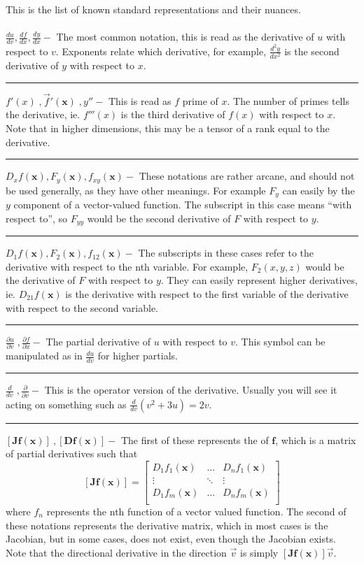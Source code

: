 \documentclass{article}
\newcommand{\pt}{\mathbf}
\begin{document}

This is the list of known standard representations and their nuances.\\
\\
$\frac{du}{dv}, \frac{df}{dx}, \frac{dy}{dx}-$ The most common notation, this is read as the derivative of $u$ with respect to $v$. Exponents relate which derivative, for example, $\frac{d^2y}{dx^2}$ is the second derivative of $y$ with respect to $x$.\\
\hrule
$f'(x)\; ,\vec{f}'(\pt{x})\;, y''-$ This is read as $f$ prime of $x$. The number of primes tells the derivative, ie. $f'''(x)$ is the third derivative of $f(x)$ with respect to $x$. Note that in higher dimensions, this may be a tensor of a rank equal to the derivative.\\
\hrule
$D_xf(\pt{x}), F_y(\pt{x}), f_{xy}(\pt{x})-$ These notations are rather arcane, and should not be used generally, as they have other meanings. For example $F_y$ can easily by the $y$ component of a vector-valued function. The subscript in this case means ``with respect to'', so $F_{yy}$ would be the second derivative of $F$ with respect to $y$.\\
\hrule
$D_1f(\pt{x}), F_2(\pt{x}), f_{12}(\pt{x})-$ The subscripts in these cases refer to the derivative with respect to the nth variable. For example, $F_2(x,y,z)$ would be the derivative of $F$ with respect to $y$. They can easily represent higher derivatives, ie. $D_{21}f(\pt{x})$ is the derivative with respect to the first variable of the derivative with respect to the second variable.\\
\hrule
$\frac{\partial u}{\partial v}\; ,\frac{\partial f}{\partial x}-$ The partial derivative of $u$ with respect to $v$. This symbol can be manipulated as in $\frac{du}{dv}$ for higher partials.\\
\hrule
$\frac{d}{dv}\;,\frac{\partial}{\partial v}-$ This is the operator version of the derivative. Usually you will see it acting on something such as $\frac{d}{dv}(v^2+3u) = 2v$.\\
\hrule
$[\mathbf{Jf}(\pt{x})]\:,[\mathbf{Df}(\pt{x})]-$ The first of these represents the  of $\mathbf{f}$, which is a matrix of partial derivatives such that
$$[\mathbf{Jf}(\pt{x})] = \left[\begin{array}{ccc}
D_1f_1(\pt{x}) & \dots & D_nf_1(\pt{x})\\
\vdots & \ddots & \vdots\\
D_1f_m(\pt{x}) & \dots & D_nf_m(\pt{x})\\
\end{array}\right]$$
where $f_n$ represents the nth function of a vector valued function. The second of these notations represents the derivative matrix, which in most cases is the Jacobian, but in some cases, does not exist, even though the Jacobian exists. Note that the directional derivative in the direction $\vec{v}$ is simply $[\mathbf{Jf}(\pt{x})]\vec{v}$.\\
\end{document}

